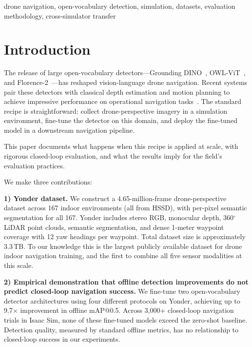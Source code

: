\documentclass[conference]{IEEEtran}
\begin{document}
\begin{IEEEkeywords}
drone navigation, open-vocabulary detection, simulation, datasets, evaluation methodology, cross-simulator transfer
\end{IEEEkeywords}

\section{Introduction}

The release of large open-vocabulary detectors---Grounding DINO~\cite{liu2024grounding}, OWL-ViT~\cite{minderer2023scaling}, and Florence-2~\cite{xiao2024florence}---has reshaped vision-language drone navigation. Recent systems pair these detectors with classical depth estimation and motion planning to achieve impressive performance on operational navigation tasks~\cite{anon2026closing,anon2026engineering}. The standard recipe is straightforward: collect drone-perspective imagery in a simulation environment, fine-tune the detector on this domain, and deploy the fine-tuned model in a downstream navigation pipeline.

This paper documents what happens when this recipe is applied at scale, with rigorous closed-loop evaluation, and what the results imply for the field's evaluation practices.

We make three contributions:

\textbf{1) Yonder dataset.} We construct a 4.65-million-frame drone-perspective dataset across 167 indoor environments (all from HSSD), with per-pixel semantic segmentation for all 167. Yonder includes stereo RGB, monocular depth, 360$^{\circ}$ LiDAR point clouds, semantic segmentation, and dense 1-meter waypoint coverage with 12 yaw headings per waypoint. Total dataset size is approximately 3.3\,TB. To our knowledge this is the largest publicly available dataset for drone indoor navigation training, and the first to combine all five sensor modalities at this scale.

\textbf{2) Empirical demonstration that offline detection improvements do not predict closed-loop navigation success.} We fine-tune two open-vocabulary detector architectures using four different protocols on Yonder, achieving up to 9.7$\times$ improvement in offline mAP@0.5. Across 3,000+ closed-loop navigation trials in Isaac Sim, none of these fine-tuned models exceed the zero-shot baseline. Detection quality, measured by standard offline metrics, has no relationship to closed-loop success in our experiments.
\end{document}
